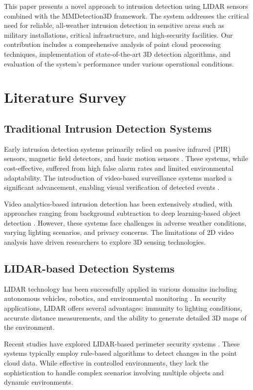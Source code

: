 \documentclass[conference]{IEEEtran}
\begin{document}
This paper presents a novel approach to intrusion detection using LIDAR sensors combined with the MMDetection3D framework. The system addresses the critical need for reliable, all-weather intrusion detection in sensitive areas such as military installations, critical infrastructure, and high-security facilities. Our contribution includes a comprehensive analysis of point cloud processing techniques, implementation of state-of-the-art 3D detection algorithms, and evaluation of the system's performance under various operational conditions.

\section{Literature Survey}
\subsection{Traditional Intrusion Detection Systems}
Early intrusion detection systems primarily relied on passive infrared (PIR) sensors, magnetic field detectors, and basic motion sensors \cite{kumar2018security}. These systems, while cost-effective, suffered from high false alarm rates and limited environmental adaptability. The introduction of video-based surveillance systems marked a significant advancement, enabling visual verification of detected events \cite{singh2019video}.

Video analytics-based intrusion detection has been extensively studied, with approaches ranging from background subtraction to deep learning-based object detection \cite{zhang2020deep}. However, these systems face challenges in adverse weather conditions, varying lighting scenarios, and privacy concerns. The limitations of 2D video analysis have driven researchers to explore 3D sensing technologies.

\subsection{LIDAR-based Detection Systems}
LIDAR technology has been successfully applied in various domains including autonomous vehicles, robotics, and environmental monitoring \cite{li2021lidar}. In security applications, LIDAR offers several advantages: immunity to lighting conditions, accurate distance measurements, and the ability to generate detailed 3D maps of the environment.

Recent studies have explored LIDAR-based perimeter security systems \cite{chen2020lidar}. These systems typically employ rule-based algorithms to detect changes in the point cloud data. While effective in controlled environments, they lack the sophistication to handle complex scenarios involving multiple objects and dynamic environments.
\end{document}
